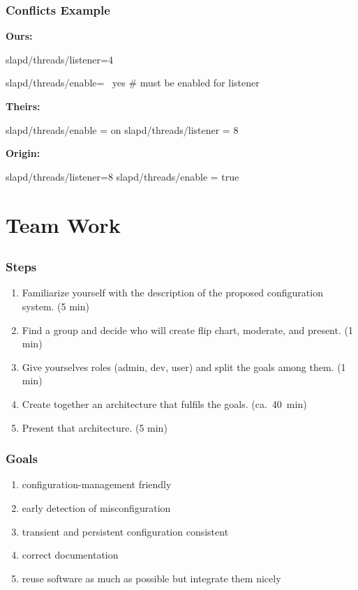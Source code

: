 \begin{frame}[fragile]
	\frametitle{Conflicts Example}

	\textbf{Ours:}
	\begin{code}[gobble=4,language=CfgElektra]
	slapd/threads/listener=4

	slapd/threads/enable= \
		yes # must be enabled for listener

	\end{code}

	\textbf{Theirs:}
	\begin{code}[gobble=4,language=CfgElektra]
	slapd/threads/enable = on
	slapd/threads/listener = 8
	\end{code}

	\pause
	\textbf{Origin:}
	\begin{code}[gobble=4,language=CfgElektra]
	slapd/threads/listener=8
	slapd/threads/enable = true
	\end{code}
\end{frame}





\section{Team Work}

\subsection{}

\begin{frame}
	\frametitle{Steps}


	\begin{enumerate}
	\item Familiarize yourself with the description of the proposed configuration system. (5 min)
	\item Find a group and decide who will create flip chart, moderate, and present. (1 min)
	\item Give yourselves roles (admin, dev, user) and split the goals among them. (1 min)
	\item Create together an architecture that fulfils the goals. (ca.~40~min)
	\item Present that architecture. (5 min)
	\end{enumerate}
\end{frame}

\begin{frame}
	\frametitle{Goals}

	\begin{enumerate}
	\item configuration-management friendly
	\item early detection of misconfiguration
	\item transient and persistent configuration consistent
	\item correct documentation
	\item reuse software as much as possible but integrate them nicely
	\end{enumerate}
\end{frame}

